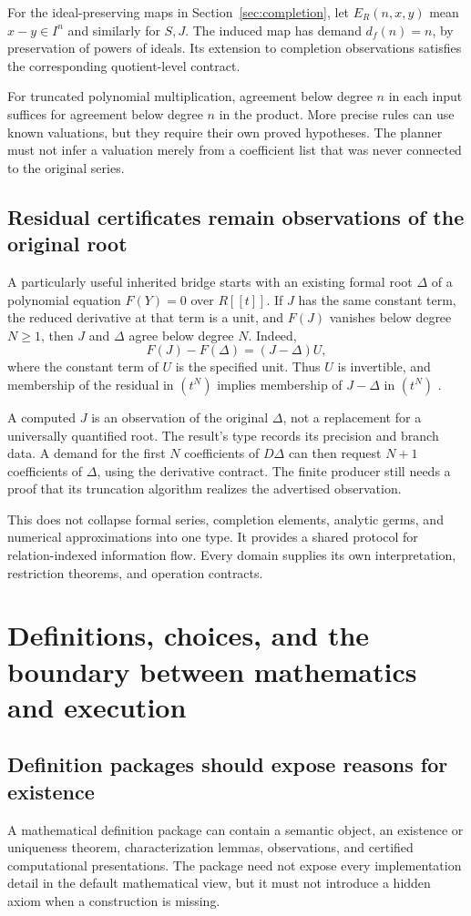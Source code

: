 \documentclass[11pt,a4paper]{article}
\theoremstyle{plain}
\theoremstyle{definition}
\theoremstyle{remark}
\begin{document}
For the ideal-preserving maps in Section~\ref{sec:completion}, let $E_R(n,x,y)$
mean $x-y\in I^n$ and similarly for $S,J$. The induced map has demand
$d_f(n)=n$, by preservation of powers of ideals. Its extension to completion
observations satisfies the corresponding quotient-level contract.

For truncated polynomial multiplication, agreement below degree $n$ in each
input suffices for agreement below degree $n$ in the product. More precise
rules can use known valuations, but they require their own proved hypotheses.
The planner must not infer a valuation merely from a coefficient list that
was never connected to the original series.

\subsection{Residual certificates remain observations of the original root}
A particularly useful inherited bridge starts with an existing formal root
$\Delta$ of a polynomial equation $F(Y)=0$ over $R[[t]]$. If $J$ has the same
constant term, the reduced derivative at that term is a unit, and
$F(J)$ vanishes below degree $N\ge1$, then $J$ and $\Delta$ agree below degree
$N$. Indeed,
\[
 F(J)-F(\Delta)=(J-\Delta)U,
\]
where the constant term of $U$ is the specified unit. Thus $U$ is invertible,
and membership of the residual in $(t^N)$ implies membership of
$J-\Delta$ in $(t^N)$ \cite{synthesis,workbenches}.

A computed $J$ is an observation of the original $\Delta$, not a replacement
for a universally quantified root. The result's type records its precision
and branch data. A demand for the first $N$ coefficients of $D\Delta$ can
then request $N+1$ coefficients of $\Delta$, using the derivative contract.
The finite producer still needs a proof that its truncation algorithm realizes
the advertised observation.

This does not collapse formal series, completion elements, analytic germs,
and numerical approximations into one type. It provides a shared protocol for
relation-indexed information flow. Every domain supplies its own interpretation,
restriction theorems, and operation contracts.

\section{Definitions, choices, and the boundary between mathematics and execution}
\label{sec:definitions}
\subsection{Definition packages should expose reasons for existence}
A mathematical definition package can contain a semantic object, an existence
or uniqueness theorem, characterization lemmas, observations, and certified
computational presentations. The package need not expose every implementation
detail in the default mathematical view, but it must not introduce a hidden
axiom when a construction is missing.
\end{document}
